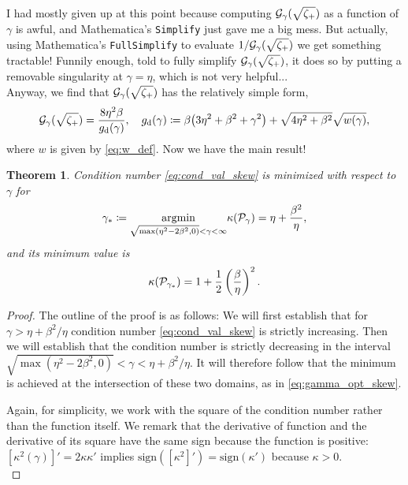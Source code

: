 \documentclass[a4paper,10pt]{article}
\newtheorem{theorem}{Theorem}
\begin{document}
{\begin{itemize}
I had mostly given up at this point because computing ${\cal G}_{\gamma}(\sqrt{\zeta_+})$ as a function of $\gamma$ is awful, and Mathematica's \texttt{Simplify} just gave me a big mess. But actually, using Mathematica's \texttt{FullSimplify} to evaluate $1/{\cal G}_{\gamma}(\sqrt{\zeta_+})$ we get something tractable! Funnily enough, told to fully simplify ${\cal G}_{\gamma}(\sqrt{\zeta_+})$, it does so by putting a removable singularity at $\gamma = \eta$, which is not very helpful...\\

Anyway, we find that ${\cal G}_{\gamma}(\sqrt{\zeta_+})$ has the relatively simple form,
\begin{align}
\label{eq:g_d_def}
{\cal G}_{\gamma}(\sqrt{\zeta_+}) 
=
\frac{8 \eta^2 \beta}{g_{\rm d}(\gamma)}, \quad
g_{\rm d}(\gamma) \coloneqq
\beta \big( 3 \eta^2 + \beta^2 + \gamma^2 \big)  +  \sqrt{4 \eta^2 + \beta^2} \sqrt{w(\gamma)},
\end{align}
where $w$ is given by \eqref{eq:w_def}. Now we have the main result!
\begin{theorem}
Condition number \eqref{eq:cond_val_skew} is minimized with respect to $\gamma$ for 
\begin{align} 
\label{eq:gamma_opt_skew}
\gamma_* \coloneqq \underset{\sqrt{\max(\eta^2 - 2 \beta^2, 0)} < \gamma < \infty}{\textrm{argmin}} \kappa({\cal P}_{\gamma}) = \eta + \frac{\beta^2}{\eta},
\end{align}
and its minimum value is
\begin{align}
\label{eq:cond_opt_skew}
\kappa({\cal P}_{\gamma_*}) =  1 + \frac{1}{2} \left( \frac{\beta}{\eta} \right)^2.
\end{align}
\end{theorem}
\begin{proof}

The outline of the proof is as follows: We will first establish that for $\gamma > \eta + \beta^2/\eta$ condition number \eqref{eq:cond_val_skew} is strictly increasing. Then we will establish that the condition number is strictly decreasing in the interval $\sqrt{\max(\eta^2 - 2 \beta^2, 0)} < \gamma < \eta + \beta^2 / \eta$. It will therefore follow that the minimum is achieved at the intersection of these two domains, as in \eqref{eq:gamma_opt_skew}. 
%

Again, for simplicity, we work with the square of the condition number rather than the function itself. We remark that the derivative of function and the derivative of its square have the same sign because the function is positive: $[\kappa^2(\gamma)]' = 2 \kappa \kappa'$ implies $\textrm{sign}([\kappa^2]') = \textrm{sign}(\kappa')$ because $\kappa > 0$. \\


\end{proof}
\end{itemize}}
\end{document}
